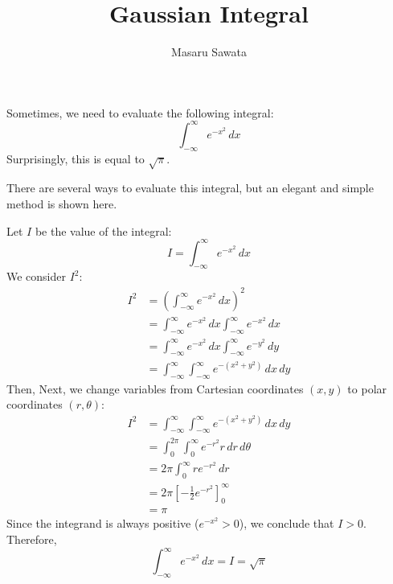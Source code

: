 \documentclass[letterpaper, 12pt]{article}
\title{Gaussian Integral}
\author{Masaru Sawata}
\theoremstyle{custom}
\begin{document}
\maketitle
Sometimes, we need to evaluate the following integral:
\begin{equation*}
  \int_{-\infty}^{\infty} e^{-x^2} \, dx
\end{equation*}
Surprisingly, this is equal to $\sqrt{\pi}$.

There are several ways to evaluate this integral, but an elegant and simple method is shown here.

Let $I$ be the value of the integral:
\begin{equation*}
  I = \int_{-\infty}^{\infty} e^{-x^2} \, dx
\end{equation*}
We consider $I^2$:
\begin{align*}
  I^2 
  &= \left( \int_{-\infty}^{\infty} e^{-x^2} \, dx \right)^2 \\
  &= \int_{-\infty}^{\infty} e^{-x^2} \, dx \int_{-\infty}^{\infty} e^{-x^2} \, dx \\
  &= \int_{-\infty}^{\infty} e^{-x^2} \, dx \int_{-\infty}^{\infty} e^{-y^2} \, dy \\
  &= \int_{-\infty}^{\infty} \int_{-\infty}^{\infty} e^{-(x^2+y^2)} \, dx \, dy
\end{align*}
Then, Next, we change variables from Cartesian coordinates $(x,y)$ to polar coordinates $(r, \theta)$:
\begin{align*}
    I^2 
  &= \int_{-\infty}^{\infty} \int_{-\infty}^{\infty} e^{-(x^2+y^2)} \, dx \, dy \\
  &= \int_{0}^{2\pi} \int_{0}^{\infty} e^{-r^2} r \, dr \, d\theta \\
  &= 2\pi \int_{0}^{\infty} re^{-r^2} \, dr \\
  &= 2\pi \left[ -\frac{1}{2}e^{-r^2} \right]_{0}^{\infty}\\
  &= \pi
\end{align*}
Since the integrand is always positive ($e^{-x^2}>0$), we conclude that $I>0$. Therefore,
\begin{equation*}
  \int_{-\infty}^{\infty} e^{-x^2} \, dx = I = \sqrt{\pi}
\end{equation*}
\end{document}
